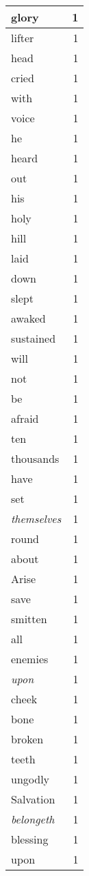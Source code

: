 \begin{center}
\begin{longtable}{l|r}
glory & 1 \\ \hline
lifter & 1 \\ \hline
head & 1 \\ \hline
cried & 1 \\ \hline
with & 1 \\ \hline
voice & 1 \\ \hline
he & 1 \\ \hline
heard & 1 \\ \hline
out & 1 \\ \hline
his & 1 \\ \hline
holy & 1 \\ \hline
hill & 1 \\ \hline
laid & 1 \\ \hline
down & 1 \\ \hline
slept & 1 \\ \hline
awaked & 1 \\ \hline
sustained & 1 \\ \hline
will & 1 \\ \hline
not & 1 \\ \hline
be & 1 \\ \hline
afraid & 1 \\ \hline
ten & 1 \\ \hline
thousands & 1 \\ \hline
have & 1 \\ \hline
set & 1 \\ \hline
\emph{themselves} & 1 \\ \hline
round & 1 \\ \hline
about & 1 \\ \hline
Arise & 1 \\ \hline
save & 1 \\ \hline
smitten & 1 \\ \hline
all & 1 \\ \hline
enemies & 1 \\ \hline
\emph{upon} & 1 \\ \hline
cheek & 1 \\ \hline
bone & 1 \\ \hline
broken & 1 \\ \hline
teeth & 1 \\ \hline
ungodly & 1 \\ \hline
Salvation & 1 \\ \hline
\emph{belongeth} & 1 \\ \hline
blessing & 1 \\ \hline
upon & 1 \\ \hline
\end{longtable}
\end{center}



